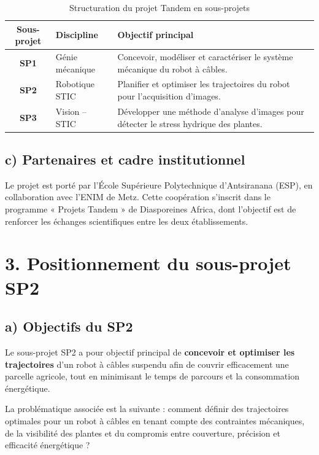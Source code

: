 \begin{table}[H]
\centering
\caption{Structuration du projet Tandem en sous-projets}
\label{tab:sousprojets}
\begin{tabular}{|c|l|>{\raggedright\arraybackslash}p{7.5cm}|}
\hline
\textbf{Sous-projet} & \textbf{Discipline} & \textbf{Objectif principal} \\
\hline
\textbf{SP1} & Génie mécanique & Concevoir, modéliser et caractériser le système mécanique du robot à câbles. \\
\hline
\textbf{SP2} & Robotique STIC & Planifier et optimiser les trajectoires du robot pour l'acquisition d'images. \\
\hline
\textbf{SP3} & Vision -- STIC & Développer une méthode d'analyse d'images pour détecter le stress hydrique des plantes. \\
\hline
\end{tabular}
\end{table}

\subsection*{c) Partenaires et cadre institutionnel}

Le projet est porté par l'École Supérieure Polytechnique d'Antsiranana (ESP), en collaboration avec l'ENIM de Metz. Cette coopération s'inscrit dans le programme « Projets Tandem » de Diasporeines Africa, dont l'objectif est de renforcer les échanges scientifiques entre les deux établissements.

\section*{3. Positionnement du sous-projet SP2}

\subsection*{a) Objectifs du SP2}

Le sous-projet SP2 a pour objectif principal de \textbf{concevoir et optimiser les trajectoires} d'un robot à câbles suspendu afin de couvrir efficacement une parcelle agricole, tout en minimisant le temps de parcours et la consommation énergétique.

La problématique associée est la suivante : comment définir des trajectoires optimales pour un robot à câbles en tenant compte des contraintes mécaniques, de la visibilité des plantes et du compromis entre couverture, précision et efficacité énergétique ?

